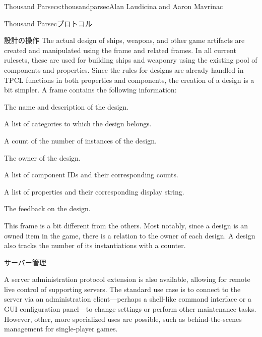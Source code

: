 \begin{aosachapter}{Thousand Parsec}{s:thousandparsec}{Alan Laudicina and Aaron Mavrinac}
\begin{aosasect1}{Thousand Parsecプロトコル}
\begin{aosasect2}{設計の操作}
The actual design of ships, weapons, and other game artifacts are
created and manipulated using the  frame and related
frames. In all current rulesets, these are used for building ships and
weaponry using the existing pool of components and properties. Since
the rules for designs are already handled in TPCL 
functions in both properties and components, the creation of a design
is a bit simpler. A  frame contains the following
information:

\begin{aosaitemize}

  \item The name and description of the design.

  \item A list of categories to which the design belongs.

  \item A count of the number of instances of the design.

  \item The owner of the design.

  \item A list of component IDs and their corresponding counts.

  \item A list of properties and their corresponding display string.

  \item The feedback on the design.

\end{aosaitemize}

This frame is a bit different from the others. Most notably, since a
design is an owned item in the game, there is a relation to the owner
of each design. A design also tracks the number of its instantiations
with a counter.

\end{aosasect2}

\begin{aosasect2}{サーバー管理}

A server administration protocol extension is also available, allowing
for remote live control of supporting servers. The standard use case
is to connect to the server via an administration client---perhaps a
shell-like command interface or a GUI configuration panel---to change
settings or perform other maintenance tasks. However, other, more
specialized uses are possible, such as behind-the-scenes management
for single-player games.


\end{aosasect2}
\end{aosasect1}
\end{aosachapter}
